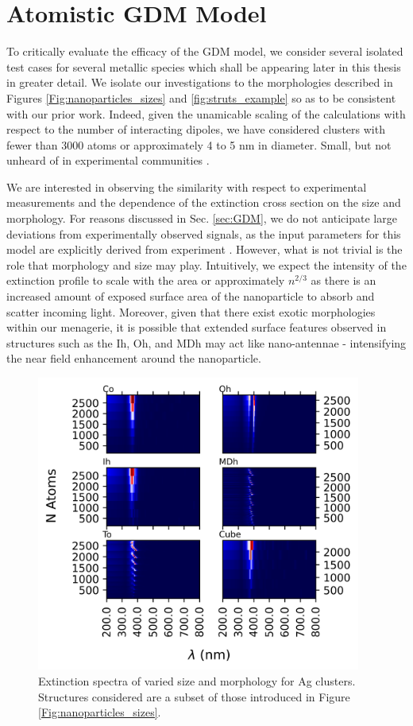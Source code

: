 \section{Atomistic GDM Model}

To critically evaluate the efficacy of the GDM model, we consider several isolated test cases for several metallic species which shall be appearing later in this thesis in greater detail. We isolate our investigations to the morphologies described in Figures \ref{Fig:nanoparticles_sizes} and \ref{fig:struts_example} so as to be consistent with our prior work. Indeed, given the unamicable scaling of the calculations with respect to the number of interacting dipoles, we have considered clusters with fewer than 3000 atoms or approximately 4 to 5 nm in diameter. Small, but not unheard of in experimental communities \cite{JorgeStructure}.  

We are interested in observing the similarity with respect to experimental measurements and the dependence of the extinction cross section on the size and morphology. For reasons discussed in Sec. \ref{sec:GDM}, we do not anticipate large deviations from experimentally observed signals, as the input parameters for this model are explicitly derived from experiment \cite{pyGDM}. However, what is not trivial is the role that morphology and size may play. Intuitively, we expect the intensity of the extinction profile to scale with the area or approximately $n^{2/3}$ as there is an increased amount of exposed surface area of the nanoparticle to absorb and scatter incoming light. Moreover, given that there exist exotic morphologies within our menagerie, it is possible that extended surface features observed in structures such as the Ih, Oh, and MDh may act like nano-antennae - intensifying the near field enhancement around the nanoparticle.

\begin{figure}[b]
    \includegraphics[width=0.95\textwidth]{figures/LM/GDM/Ag_Specs.png}
    \caption{Extinction spectra of varied size and morphology for Ag clusters. Structures considered are a subset of those introduced in Figure \ref{Fig:nanoparticles_sizes}.} 
    \label{Fig:Size_Ag_GDM}
\end{figure}

